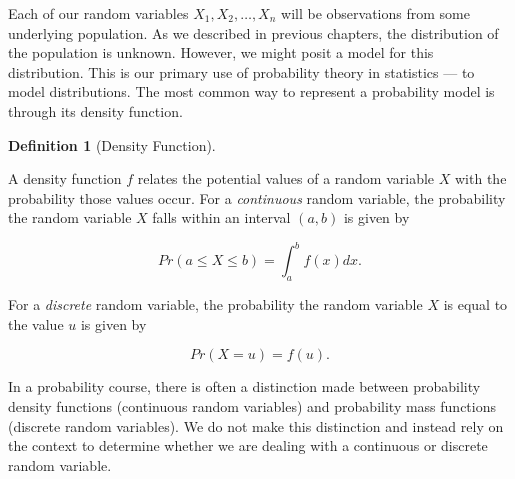 \documentclass[
  letterpaper,
  DIV=11,
  numbers=noendperiod]{scrreprt}
\theoremstyle{definition}
\theoremstyle{definition}
\newtheorem{definition}{Definition}[chapter]
\theoremstyle{remark}
\begin{document}
Each of our random variables \(X_1, X_2, \dotsc, X_n\) will be
observations from some underlying population. As we described in
previous chapters, the distribution of the population is unknown.
However, we might posit a model for this distribution. This is our
primary use of probability theory in statistics --- to model
distributions. The most common way to represent a probability model is
through its density function.

\begin{definition}[Density
Function]\protect\hypertarget{def-density-function}{}\label{def-density-function}

A density function \(f\) relates the potential values of a random
variable \(X\) with the probability those values occur. For a
\emph{continuous} random variable, the probability the random variable
\(X\) falls within an interval \((a, b)\) is given by

\[Pr(a \leq X \leq b) = \int_{a}^{b} f(x) dx.\]

For a \emph{discrete} random variable, the probability the random
variable \(X\) is equal to the value \(u\) is given by

\[Pr(X = u) = f(u).\]

\end{definition}

\begin{tcolorbox}[enhanced jigsaw, bottomrule=.15mm, titlerule=0mm, bottomtitle=1mm, colback=white, coltitle=black, rightrule=.15mm, leftrule=.75mm, toprule=.15mm, toptitle=1mm, left=2mm, opacityback=0, colframe=quarto-callout-note-color-frame, breakable, title=\textcolor{quarto-callout-note-color}{\faInfo}\hspace{0.5em}{Note}, arc=.35mm, colbacktitle=quarto-callout-note-color!10!white, opacitybacktitle=0.6]

In a probability course, there is often a distinction made between
probability density functions (continuous random variables) and
probability mass functions (discrete random variables). We do not make
this distinction and instead rely on the context to determine whether we
are dealing with a continuous or discrete random variable.

\end{tcolorbox}
\end{document}
